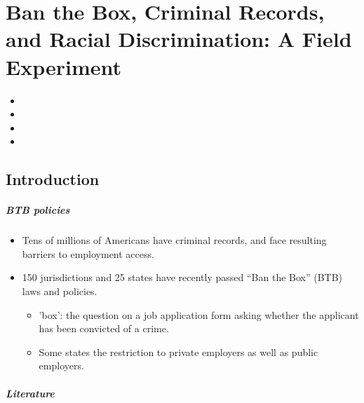 \documentclass[../root]{subfiles}
\begin{document}
    \chapter{Ban the Box, Criminal Records, and Racial Discrimination: A Field Experiment}

    \begin{shortsummary}
        \begin{itemize}
            \item {}
            \item {}
            \item {}
            \item {}
        \end{itemize}
    \end{shortsummary}

    \section{Introduction}

    \paragraph{BTB policies}

    \begin{itemize}
      \item Tens of millions of Americans have criminal records, and face resulting barriers to employment access.
      \item 150 jurisdictions and 25 states have recently passed “Ban the Box” (BTB) laws and policies.
      \begin{itemize}
        \item 'box': the question on a job application form asking whether the applicant has been convicted of a crime.
        \item Some states the restriction to private employers as well as public employers.
      \end{itemize}
    \end{itemize}

    \paragraph{Literature}
\end{document}
